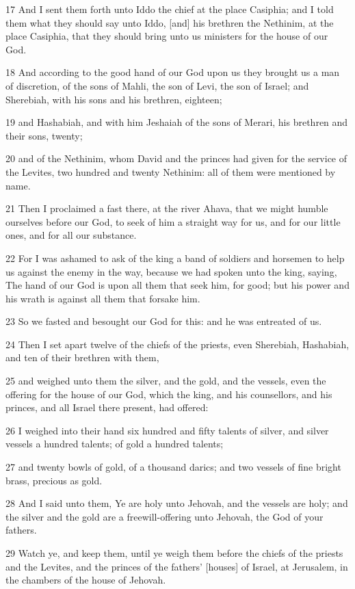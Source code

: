 \par 17 And I sent them forth unto Iddo the chief at the place Casiphia; and I told them what they should say unto Iddo, [and] his brethren the Nethinim, at the place Casiphia, that they should bring unto us ministers for the house of our God.
\par 18 And according to the good hand of our God upon us they brought us a man of discretion, of the sons of Mahli, the son of Levi, the son of Israel; and Sherebiah, with his sons and his brethren, eighteen;
\par 19 and Hashabiah, and with him Jeshaiah of the sons of Merari, his brethren and their sons, twenty;
\par 20 and of the Nethinim, whom David and the princes had given for the service of the Levites, two hundred and twenty Nethinim: all of them were mentioned by name.
\par 21 Then I proclaimed a fast there, at the river Ahava, that we might humble ourselves before our God, to seek of him a straight way for us, and for our little ones, and for all our substance.
\par 22 For I was ashamed to ask of the king a band of soldiers and horsemen to help us against the enemy in the way, because we had spoken unto the king, saying, The hand of our God is upon all them that seek him, for good; but his power and his wrath is against all them that forsake him.
\par 23 So we fasted and besought our God for this: and he was entreated of us.
\par 24 Then I set apart twelve of the chiefs of the priests, even Sherebiah, Hashabiah, and ten of their brethren with them,
\par 25 and weighed unto them the silver, and the gold, and the vessels, even the offering for the house of our God, which the king, and his counsellors, and his princes, and all Israel there present, had offered:
\par 26 I weighed into their hand six hundred and fifty talents of silver, and silver vessels a hundred talents; of gold a hundred talents;
\par 27 and twenty bowls of gold, of a thousand darics; and two vessels of fine bright brass, precious as gold.
\par 28 And I said unto them, Ye are holy unto Jehovah, and the vessels are holy; and the silver and the gold are a freewill-offering unto Jehovah, the God of your fathers.
\par 29 Watch ye, and keep them, until ye weigh them before the chiefs of the priests and the Levites, and the princes of the fathers' [houses] of Israel, at Jerusalem, in the chambers of the house of Jehovah.
